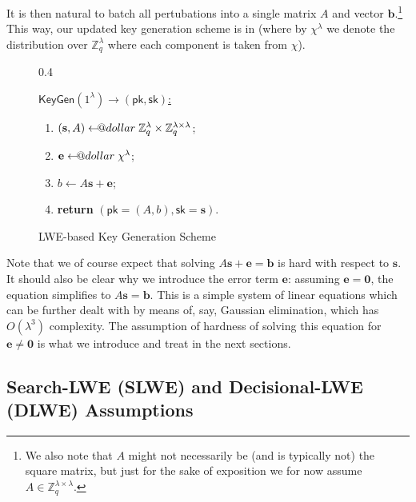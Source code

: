 \documentclass{template}
\makeatletter
\newcommand\leftarrowS{\leftarrow\joinrel\smalldollar}
\newcommand{\smalldollar}{\mathrel{\mathpalette\small@dollar\relax}}
\newcommand{\small@dollar}[2]{%
  \vcenter{\hbox{%
    $#1\textnormal{\fontsize{0.7\dimexpr\f@size pt}{0}\selectfont\$}$%
  }}%
}
\makeatother
\begin{document}
It is then natural to batch all pertubations into a single matrix $A$ and vector
$\mathbf{b}$.\footnote{We also note that $A$ might not necessarily be (and is
typically not) the square matrix, but just for the sake of exposition we for now
assume $A \in \mathbb{Z}_q^{\lambda \times \lambda}$.} This way, our updated key
generation scheme is in  (where by $\chi^{\lambda}$ we denote
the distribution over $\mathbb{Z}_q^{\lambda}$ where each component is taken
from $\chi$).

\begin{figure}[ht]
\centering
\begin{varwidth}{0.4\linewidth}
\begin{mdframed}[linecolor=black,
                 linewidth=1.0pt,
                 skipabove=10pt,
                 skipbelow=10pt,
                 leftmargin=0pt,
                 rightmargin=0pt]
\colorbox{purple!10}{\underline{$\mathsf{KeyGen}(1^{\lambda}) \to (\mathsf{pk},\mathsf{sk})$:}}
\begin{enumerate}
    \item $(\mathbf{s}, A) \leftarrowS \mathbb{Z}_q^{\lambda} \times \mathbb{Z}_q^{\lambda \times \lambda}$;
    \item $\mathbf{e} \leftarrowS \chi^{\lambda}$;
    \item $b \gets A\mathbf{s} + \mathbf{e}$;
    \item \textbf{return} $(\mathsf{pk}=(A,b), \mathsf{sk}=\mathbf{s})$.
\end{enumerate}
\end{mdframed}
\end{varwidth}
\caption{LWE-based Key Generation Scheme}
\label{fig:keygen}
\end{figure}

Note that we of course expect that solving $A\mathbf{s}+\mathbf{e}=\mathbf{b}$
is hard with respect to $\mathbf{s}$. It should also be clear why we introduce
the error term $\mathbf{e}$: assuming $\mathbf{e}=\mathbf{0}$, the equation
simplifies to $A\mathbf{s}=\mathbf{b}$. This is a simple system of linear
equations which can be further dealt with by means of, say, Gaussian
elimination, which has $O(\lambda^3)$ complexity. The assumption of hardness of
solving this equation for $\mathbf{e} \neq \mathbf{0}$ is what we introduce and
treat in the next sections.

\subsection{Search-LWE (SLWE) and Decisional-LWE (DLWE) Assumptions}
\end{document}
